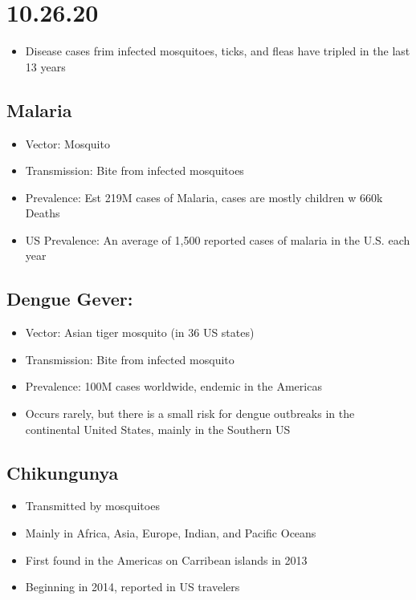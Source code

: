 \documentclass[11pt]{article}
\author{Sudhan Chitgopkar}
\date{\today}
\title{}
\begin{document}
\tableofcontents

\section{10.26.20}
\label{sec:org20e4e5f}
\begin{itemize}
\item Disease cases frim infected mosquitoes, ticks, and fleas have tripled in the last 13 years
\end{itemize}
\subsection{Malaria}
\label{sec:org51da46c}
\begin{itemize}
\item Vector: Mosquito
\item Transmission: Bite from infected mosquitoes
\item Prevalence: Est 219M cases of Malaria, cases are mostly children w 660k Deaths
\item US Prevalence: An average of 1,500 reported cases of malaria in the U.S. each year
\end{itemize}
\subsection{Dengue Gever:}
\label{sec:org641d7d9}
\begin{itemize}
\item Vector: Asian tiger mosquito (in 36 US states)
\item Transmission: Bite from infected mosquito
\item Prevalence: 100M cases worldwide, endemic in the Americas
\item Occurs rarely, but there is a small risk for dengue outbreaks in the continental United States, mainly in the Southern US
\end{itemize}
\subsection{Chikungunya}
\label{sec:orgc31c32f}
\begin{itemize}
\item Transmitted by mosquitoes
\item Mainly in Africa, Asia, Europe, Indian, and Pacific Oceans
\item First found in the Americas on Carribean islands in 2013
\item Beginning in 2014, reported in US travelers
\end{itemize}
\end{document}
